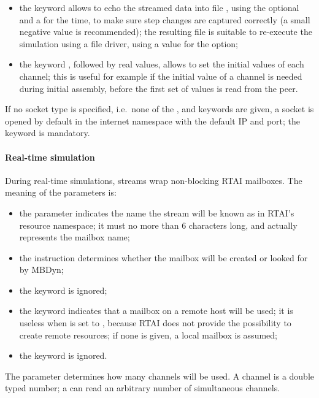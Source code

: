 \begin{itemize}
\item the keyword  allows to echo the streamed data
into file , using the optional 
and a  for the time, to make sure step changes are captured
correctly (a small negative value is recommended);
the resulting file is suitable to re-execute the simulation
using a  file driver, using a  value
for the  option;

\item the keyword ,
followed by  real values,
allows to set the initial values of each channel;
this is useful for example if the initial value of a channel
is needed during initial assembly, before the first set of values
is read from the peer.
\end{itemize}
If no socket type is specified, i.e.\ none of the ,  
and  keywords are given, a socket is opened by default 
in the internet namespace with the default IP and port; the 
keyword is mandatory.

\paragraph{Real-time simulation}
During real-time simulations, streams wrap non-blocking RTAI mailboxes.
The meaning of the parameters is:
\begin{itemize}
\item the parameter  indicates the name the stream
will be known as in RTAI's resource namespace;
it must no more than 6 characters long, and actually represents the mailbox name;
\item the instruction  determines whether the mailbox will be
created or looked for by MBDyn;
\item the keyword  is ignored;
\item the keyword  indicates that a mailbox on a remote host 
will be used; it is useless when  is set to , because
RTAI does not provide the possibility to create remote resources;
if none is given, a local mailbox is assumed;
\item the keyword  is ignored.
\end{itemize}

The parameter  determines how many
channels will be used.
A channel is a double typed number; a  can read
an arbitrary number of simultaneous channels.
